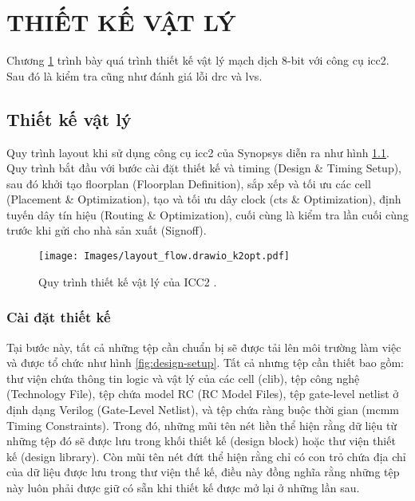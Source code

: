 \chapter{THIẾT KẾ VẬT LÝ}
\label{Chapter5}

Chương \ref{Chapter5} trình bày quá trình thiết kế vật lý mạch dịch 8-bit với công cụ \acrlong{icc2}. Sau đó là kiểm tra cũng như đánh giá lỗi \acrshort{drc} và \acrshort{lvs}.

\section{Thiết kế vật lý}

Quy trình layout khi sử dụng công cụ \acrshort{icc2} của Synopsys diễn ra như hình \ref{fig:layout-flow}. Quy trình bắt đầu với bước cài đặt thiết kế và timing (Design \& Timing Setup), sau đó khởi tạo floorplan (Floorplan Definition), sắp xếp và tối ưu các cell (Placement \& Optimization), tạo và tối ưu dây clock (\acrshort{cts} \& Optimization), định tuyến dây tín hiệu (Routing \& Optimization), cuối cùng là kiểm tra lần cuối cùng trước khi gửi cho nhà sản xuất (Signoff).

\begin{figure}[htp]
\centering
\captionsetup{justification=centering,margin=2cm}
\texttt{[image: Images/layout\_flow.drawio\_k2opt.pdf]}
\caption{Quy trình thiết kế vật lý của ICC2 \cite{synopsys-iccompilerii}.}
\label{fig:layout-flow}
\end{figure}

\subsection{Cài đặt thiết kế}

Tại bước này, tất cả những tệp cần chuẩn bị sẽ được tải lên môi trường làm việc và được tổ chức như hình \ref{fig:design-setup}. Tất cả nhưng tệp cần thiết bao gồm: thư viện chứa thông tin logic và vật lý của các cell (\acrlong{clib}), tệp công nghệ (Technology File), tệp chứa model RC (RC Model Files), tệp gate-level netlist ở định dạng Verilog (Gate-Level Netlist), và tệp chứa ràng buộc thời gian (\acrshort{mcmm} Timing Constraints). Trong đó, những mũi tên nét liền thể hiện rằng dữ liệu từ những tệp đó sẽ được lưu trong khối thiết kế (design block) hoặc thư viện thiết kế (design library). Còn mũi tên nét đứt thể hiện rằng chỉ có con trỏ chứa địa chỉ của dữ liệu được lưu trong thư viện thế kế, điều này đồng nghĩa rằng những tệp này luôn phải được giữ có sẵn khi thiết kế được mở lại ở những lần sau.

